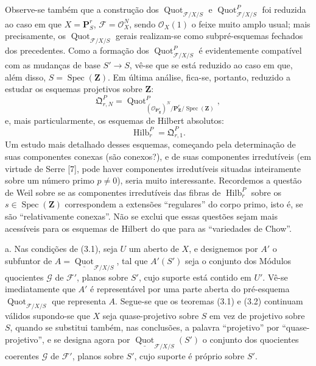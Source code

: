  Observe-se também que a construção dos
$\operatorname{Quot}_{\mathcal F/X/S}$ e
$\operatorname{Quot}^P_{\mathcal F/X/S}$ foi reduzida ao caso em que
$X=\mathbf P^r_S$, $\mathcal F=\mathcal O_X^N$, sendo $\mathcal O_X(1)$ o
feixe muito amplo usual; mais precisamente, os
$\operatorname{Quot}_{\mathcal F/X/S}$ gerais realizam-se como
subpré-esquemas fechados dos precedentes. Como a formação dos
$\operatorname{Quot}^P_{\mathcal F/X/S}$ é evidentemente compatível com as
mudanças de base $S'\longrightarrow S$, vê-se que se está reduzido ao caso em
que, além disso, $S=\operatorname{Spec}(\mathbf Z)$. Em última análise, fica-se,
portanto, reduzido a estudar os esquemas projetivos sobre $\mathbf Z$:
\[
\mathfrak Q^P_{r,N}=
\operatorname{Quot}^{P}_{(\mathcal O_{\mathbf P^r_{\mathbf Z}})^N/
\mathbf P^r_{\mathbf Z}/\operatorname{Spec}(\mathbf Z)},
\]
e, mais particularmente, os esquemas de Hilbert absolutos:
\[
\operatorname{Hilb}^P_r=\mathfrak Q^P_{r,1}.
\]
Um estudo mais detalhado desses esquemas, começando pela determinação de suas
componentes conexas (são conexos?), e de suas componentes irredutíveis
(em virtude de Serre [7], pode haver componentes irredutíveis situadas
inteiramente sobre um número primo $p\neq0$), seria muito interessante.
Recordemos a questão de Weil sobre se as componentes irredutíveis das fibras de
$\operatorname{Hilb}^P_r$ sobre os $s\in\operatorname{Spec}(\mathbf Z)$
correspondem a extensões ``regulares'' do corpo primo, isto é, se são
``relativamente conexas''. Não se exclui que essas questões sejam mais
acessíveis para os esquemas de Hilbert do que para as ``variedades de Chow''.


\noindent a. Nas condições de (3.1), seja $U$ um aberto de $X$, e designemos
por $A'$ o subfuntor de
$A=\underline{\operatorname{Quot}}_{\mathcal F/X/S}$, tal que $A'(S')$ seja
o conjunto dos Módulos quocientes $\mathcal G$ de $\mathcal F'$, planos sobre
$S'$, cujo suporte está contido em $U'$. Vê-se imediatamente que $A'$ é
representável por uma parte aberta do pré-esquema
$\operatorname{Quot}_{\mathcal F/X/S}$ que representa $A$. Segue-se que os
teoremas (3.1) e (3.2)
continuam válidos supondo-se que $X$ seja quase-projetivo sobre $S$ em vez de
projetivo sobre $S$, quando se substitui também, nas conclusões, a palavra
``projetivo'' por ``quase-projetivo'', e se designa agora por
$\underline{\operatorname{Quot}}_{\mathcal F/X/S}(S')$ o conjunto dos
quocientes coerentes $\mathcal G$ de $\mathcal F'$, planos sobre $S'$, cujo
suporte é próprio sobre $S'$.

